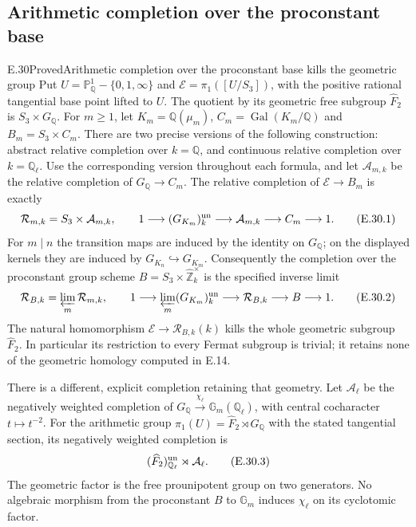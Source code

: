 \subsection{Arithmetic completion over the proconstant base}

\begin{statement}{E.30}{Proved}{Arithmetic completion over the proconstant base kills the geometric group}
Put $U=\mathbb P^1_{\mathbb Q}-\{0,1,\infty\}$ and
$\mathcal E=\pi_1([U/S_3])$, with the positive rational tangential base point lifted to $U$.
The quotient by its geometric free subgroup $\widehat F_2$ is
$S_3\times G_{\mathbb Q}$.
For $m\geq1$, let $K_m=\mathbb Q(\mu_m)$,
$C_m=\operatorname{Gal}(K_m/\mathbb Q)$ and
$B_m=S_3\times C_m$.
There are two precise versions of the following construction:
abstract relative completion over $k=\mathbb Q$, and continuous relative completion over $k=\mathbb Q_\ell$.
Use the corresponding version throughout each formula, and let
$\mathcal A_{m,k}$ be the relative completion of $G_{\mathbb Q}\to C_m$.
The relative completion of $\mathcal E\to B_m$ is exactly
\[
 \mathcal R_{m,k}=S_3\times\mathcal A_{m,k},\qquad
 1\longrightarrow(G_{K_m})^{\rm un}_k
 \longrightarrow\mathcal A_{m,k}\longrightarrow C_m
 \longrightarrow1.                                      \tag{E.30.1}
\]
For $m\mid n$ the transition maps are induced by the identity on
$G_{\mathbb Q}$; on the displayed kernels they are induced by
$G_{K_n}\hookrightarrow G_{K_m}$.
Consequently the completion over the proconstant group scheme
$B=S_3\times\widehat{\mathbb Z}^{\times}_k$ is the specified inverse limit
\[
 \mathcal R_{B,k}=\varprojlim_{m}\mathcal R_{m,k},\qquad
 1\longrightarrow\varprojlim_m(G_{K_m})^{\rm un}_k
 \longrightarrow\mathcal R_{B,k}\longrightarrow B
 \longrightarrow1.                                      \tag{E.30.2}
\]
The natural homomorphism $\mathcal E\to\mathcal R_{B,k}(k)$ kills
the whole geometric subgroup $\widehat F_2$.
In particular its restriction to every Fermat subgroup is trivial;
it retains none of the geometric homology computed in E.14.

There is a different, explicit completion retaining that geometry.
Let $\mathcal A_\ell$ be the negatively weighted completion of
$G_{\mathbb Q}\xrightarrow{\chi_\ell}\mathbb G_m(\mathbb Q_\ell)$,
with central cocharacter $t\mapsto t^{-2}$.
For the arithmetic group $\pi_1(U)=\widehat F_2\rtimes G_{\mathbb Q}$
with the stated tangential section, its negatively weighted completion is
\[
 (\widehat F_2)^{\rm un}_{\mathbb Q_\ell}\rtimes\mathcal A_\ell.
                                                               \tag{E.30.3}
\]
The geometric factor is the free prounipotent group on two generators.
No algebraic morphism from the proconstant $B$ to $\mathbb G_m$
induces $\chi_\ell$ on its cyclotomic factor.
\end{statement}
